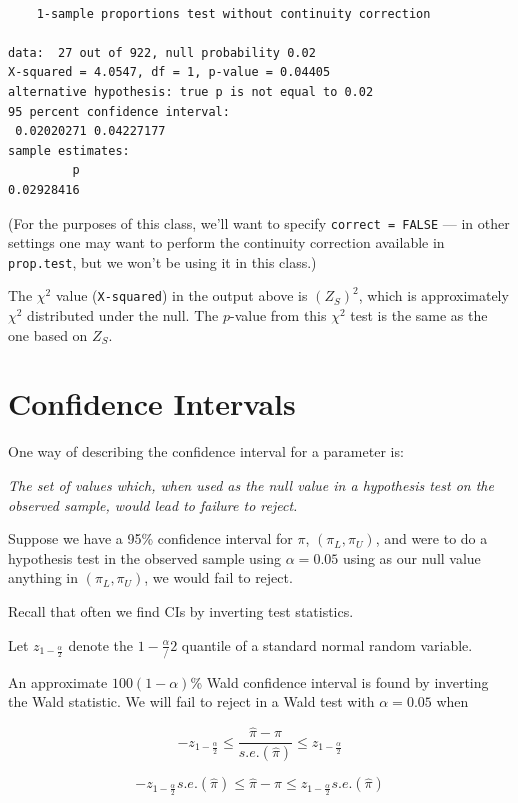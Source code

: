 \documentclass[
  letterpaper,
  DIV=11,
  numbers=noendperiod]{scrreport}
\begin{document}
\begin{verbatim}

    1-sample proportions test without continuity correction

data:  27 out of 922, null probability 0.02
X-squared = 4.0547, df = 1, p-value = 0.04405
alternative hypothesis: true p is not equal to 0.02
95 percent confidence interval:
 0.02020271 0.04227177
sample estimates:
         p 
0.02928416 
\end{verbatim}

(For the purposes of this class, we'll want to specify
\texttt{correct\ =\ FALSE} --- in other settings one may want to perform
the continuity correction available in \texttt{prop.test}, but we won't
be using it in this class.)

The \(\chi^2\) value (\texttt{X-squared}) in the output above is
\((Z_S)^2\), which is approximately \(\chi^2\) distributed under the
null. The \(p\)-value from this \(\chi^2\) test is the same as the one
based on \(Z_S\).

\hypertarget{confidence-intervals-1}{%
\section{Confidence Intervals}\label{confidence-intervals-1}}

One way of describing the confidence interval for a parameter is:

\emph{The set of values which, when used as the null value in a
hypothesis test on the observed sample, would lead to failure to
reject.}

Suppose we have a 95\% confidence interval for \(\pi\),
\((\pi_L, \pi_U)\), and were to do a hypothesis test in the observed
sample using \(\alpha = 0.05\) using as our null value anything in
\((\pi_L, \pi_U)\), we would fail to reject.

Recall that often we find CIs by inverting test statistics.

Let \(z_{1-\frac{\alpha}{2}}\) denote the \(1 - \frac{\alpha}/2\)
quantile of a standard normal random variable.

An approximate \(100(1-\alpha)\)\% Wald confidence interval is found by
inverting the Wald statistic. We will fail to reject in a Wald test with
\(\alpha = 0.05\) when

\[-z_{1-\frac{\alpha}{2}} \le \frac{\hat \pi - \pi}{s.e.(\hat \pi)} \le z_{1-\frac{\alpha}{2}} 
\]

\[-z_{1-\frac{\alpha}{2}}s.e.(\hat \pi) \le \hat \pi - \pi \le z_{1-\frac{\alpha}{2}}s.e.(\hat \pi) 
\]
\end{document}
